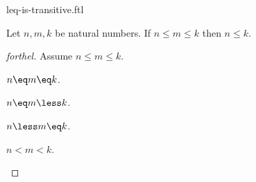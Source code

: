 \documentclass{stex}
\begin{document}
\begin{smodule}{leq-is-transitive.ftl}


\begin{proposition}[forthel,id=LeqIsTransitiveProp]
  Let $n, m, k$ be natural numbers.
  If $n \leq m \leq k$ then $n \leq k$.
\end{proposition}
\begin{proof}[forthel]
  Assume $n \leq m \leq k$.
  \begin{case}{$n \eq m \eq k$.} \end{case}
  \begin{case}{$n \eq m \less k$.} \end{case}
  \begin{case}{$n \less m \eq k$.} \end{case}
  \begin{case}{$n \less m \less k$.} \end{case}
\end{proof}

\end{smodule}
\end{document}
